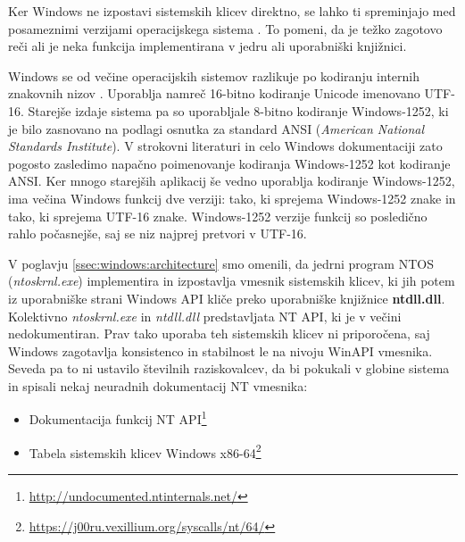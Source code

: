 \documentclass[a4paper,12pt,openright]{book}
\begin{document}
Ker Windows ne izpostavi sistemskih klicev direktno, se lahko ti spreminjajo med posameznimi verzijami operacijskega sistema \cite{Tanenbaum_Bos_2023}.
To pomeni, da je težko zagotovo reči ali je neka funkcija implementirana v jedru ali uporabniški knjižnici.

Windows se od večine operacijskih sistemov razlikuje po kodiranju internih znakovnih nizov \cite{Yosifovich_Russinovich_Solomon_Ionescu_2017}.
Uporablja namreč 16-bitno kodiranje Unicode imenovano UTF-16.
Starejše izdaje sistema pa so uporabljale 8-bitno kodiranje Windows-1252, ki je bilo zasnovano na podlagi osnutka za standard ANSI (\textit{American National Standards Institute}).
V strokovni literaturi in celo Windows dokumentaciji zato pogosto zasledimo napačno poimenovanje kodiranja Windows-1252 kot kodiranje ANSI.
Ker mnogo starejših aplikacij še vedno uporablja kodiranje Windows-1252, ima večina Windows funkcij dve verziji: tako, ki sprejema Windows-1252 znake in tako, ki sprejema UTF-16 znake.
Windows-1252 verzije funkcij so posledično rahlo počasnejše, saj se niz najprej pretvori v UTF-16.

V poglavju \ref{ssec:windows:architecture} smo omenili, da jedrni program NTOS (\textit{ntoskrnl.exe}) implementira in izpostavlja vmesnik sistemskih klicev, ki jih potem iz uporabniške strani Windows API kliče preko uporabniške knjižnice \textbf{ntdll.dll}.
Kolektivno \textit{ntoskrnl.exe} in \textit{ntdll.dll} predstavljata NT API, ki je v večini nedokumentiran.
Prav tako uporaba teh sistemskih klicev ni priporočena, saj Windows zagotavlja konsistenco in stabilnost le na nivoju WinAPI vmesnika.
Seveda pa to ni ustavilo številnih raziskovalcev, da bi pokukali v globine sistema in spisali nekaj neuradnih dokumentacij NT vmesnika:
\begin{itemize}
	\item Dokumentacija funkcij NT API\footnote{\url{http://undocumented.ntinternals.net/}}
	\item Tabela sistemskih klicev Windows x86-64\footnote{\url{https://j00ru.vexillium.org/syscalls/nt/64/}}
\end{itemize}
\end{document}

